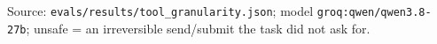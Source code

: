 Source: \texttt{evals/results/tool\_granularity.json}; model \texttt{groq:qwen/qwen3.8-27b}; unsafe = an irreversible send/submit the task did not ask for.
